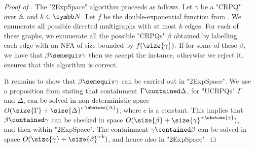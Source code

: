 \begin{proof}[Proof of ]
	The "2ExpSpace" algorithm proceeds as follows. Let $\gamma$ be a "CRPQ"  over $\mathbb{A}$ and $k\in\N$. Let $f$ be the double-exponential function from . We enumerate all possible directed multigraphs with at most $k$ edges. For each of these graphs, we enumerate all the possible "CRPQs" $\beta$ obtained by labelling each edge with an NFA of size bounded by $f(\size{\gamma})$. If for some of these $\beta$, we have that $\beta\semequiv \gamma$ then we accept the instance, otherwise we reject it.  ensures that this algorithm is correct.

	It remains to show that  $\beta\semequiv \gamma$ can be carried out in "2ExpSpace". We use a proposition from \cite[Proposition 3.11, p. 17]{FigueiraMorvan2025SemanticTreeWidthLMCS} stating that containment $\Gamma\contained \Delta$, for "UCRPQs" $\Gamma$ and  $\Delta$, can be solved in non-deterministic space $O(\size{\Gamma} + \size{\Delta}^{c\cdot \nbatoms{\Delta}})$, where $c$ is a constant. This implies that $\beta\contained \gamma$ can be checked in space $O(\size{\beta} + \size{\gamma}^{c\cdot \nbatoms{\gamma}})$, and then within "2ExpSpace". The containment $\gamma\contained \beta$ can be solved in space $O(\size{\gamma} + \size{\beta}^{c\cdot k})$, and hence also in "2ExpSpace".
\end{proof}


